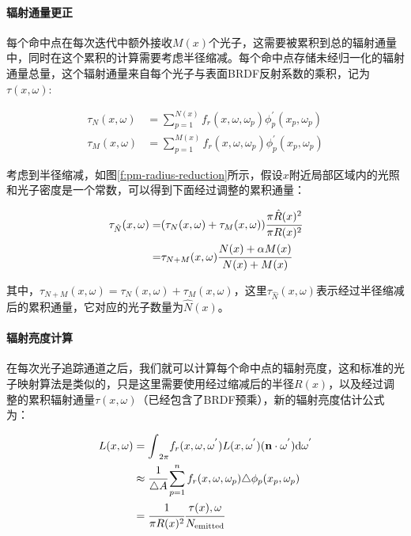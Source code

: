 \paragraph{辐射通量更正}
每个命中点在每次迭代中额外接收$M(x)$个光子，这需要被累积到总的辐射通量中，同时在这个累积的计算需要考虑半径缩减。每个命中点存储未经归一化的辐射通量总量，这个辐射通量来自每个光子与表面BRDF反射系数的乘积，记为$\tau(x,{\omega})$:

\begin{equation}
\begin{aligned}
	\tau_N(x,{\omega})&=\sum^{N(x)}_{p=1}f_r(x,{\omega},{\omega}_p)\phi^{'}_p(x_p,{\omega}_p)\\
	\tau_M(x,{\omega})&=\sum^{M(x)}_{p=1}f_r(x,{\omega},{\omega}_p)\phi^{'}_p(x_p,{\omega}_p)
\end{aligned}
\end{equation}

考虑到半径缩减，如图\ref{f:pm-radius-reduction}所示，假设$x$附近局部区域内的光照和光子密度是一个常数，可以得到下面经过调整的累积通量：

\begin{equation}
	\begin{aligned}
		\tau_{\hat{N}}(x,{\omega})=&(\tau_N(x,{\omega})+\tau_M(x,{\omega})) \cfrac{\pi \hat{R}(x)^{2}}{\pi R(x)^{2}}\\
		=&\tau_{N+M}(x,{\omega}) \cfrac{N(x)+\alpha M(x)}{N(x)+M(x)}
	\end{aligned}
\end{equation}

\noindent 其中，$\tau_{N+M}(x,{\omega})=\tau_{N}(x,{\omega})+\tau_{M}(x,{\omega})$，这里$\tau_{\hat{N}}(x,{\omega})$表示经过半径缩减后的累积通量，它对应的光子数量为$\hat{N}(x)$。




\paragraph{辐射亮度计算}
在每次光子追踪通道之后，我们就可以计算每个命中点的辐射亮度，这和标准的光子映射算法是类似的，只是这里需要使用经过缩减后的半径$R(x)$，以及经过调整的累积辐射通量$\tau (x,{\omega})$（已经包含了BRDF预乘），新的辐射亮度估计公式为：

\begin{equation}\label{sec:pm-radiance-estmator}
	\begin{aligned}
		L(x,{\omega})&={\rm \int}_{2\pi}f_r(x,{\omega},{\omega}^{'})L(x,{\omega}^{'})(\mathbf{n}\cdot{\omega}^{'}){\rm d}{\omega}^{'}\\
		&\approx  \cfrac{1}{\triangle A}\sum^{n}_{p=1}f_r(x,{\omega},{\omega}_p)\triangle\phi_p(x_p,{\omega}_p)\\
		&= \cfrac{1}{\pi R(x)^{2}} \cfrac{\tau (x),{\omega}}{N_{\rm emitted}}
	\end{aligned}
\end{equation}

